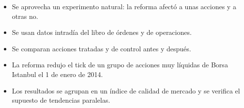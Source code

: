 \documentclass{article}
\newcommand{\cardtitlesize}{\fontsize{37.8}{45.4}\selectfont}
\newcommand{\cardtitle}[2][navy]{{\color{#1}\cardtitlesize\bfseries\textls[110]{\MakeUppercase{#2}}}\par\vspace{7mm}}
\begin{document}
\vfill
\hspace*{34mm}\begin{minipage}{773mm}
\begin{tcolorbox}[card]\cardtitle{Metodología}
\begin{minipage}[t]{0.48\linewidth}
\begin{itemize}
\item Se aprovecha un experimento natural: la reforma afectó a unas acciones y a otras no.
\item Se usan datos intradía del libro de órdenes y de operaciones.
\item Se comparan acciones tratadas y de control antes y después.
\end{itemize}
\end{minipage}\hfill
\begin{minipage}[t]{0.48\linewidth}
\begin{itemize}
\item La reforma redujo el tick de un grupo de acciones muy líquidas de Borsa Istanbul el 1 de enero de 2014.
\item Los resultados se agrupan en un índice de calidad de mercado y se verifica el supuesto de tendencias paralelas.
\end{itemize}
\end{minipage}
\end{tcolorbox}
\end{minipage}
\end{document}
